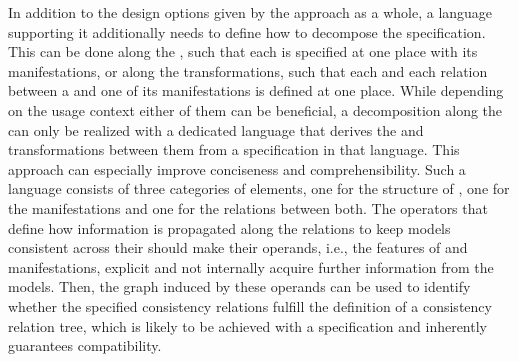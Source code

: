 \begin{insight}[Language]
    In addition to the design options given by the \commonalities approach as a whole, a language supporting it additionally needs to define how to decompose the specification.
    This can be done along the \commonalities, such that each \commonality is specified at one place with its manifestations, or along the transformations, such that each \conceptmetamodel and each relation between a \conceptmetamodel and one of its manifestations is defined at one place.
    While depending on the usage context either of them can be beneficial, a decomposition along the \commonalities can only be realized with a dedicated language that derives the \conceptmetamodels and transformations between them from a specification in that language. This approach can especially improve conciseness and comprehensibility.
    Such a language consists of three categories of elements, one for the structure of \conceptmetamodels, one for the manifestations and one for the relations between both.
    The operators that define how information is propagated along the relations to keep models consistent across their \commonalities should make their operands, i.e., the features of \commonalities and manifestations, explicit and not internally acquire further information from the models.
    Then, the graph induced by these operands can be used to identify whether the specified consistency relations fulfill the definition of a consistency relation tree, which is likely to be achieved with a \commonalities specification and inherently guarantees compatibility.
\end{insight}

